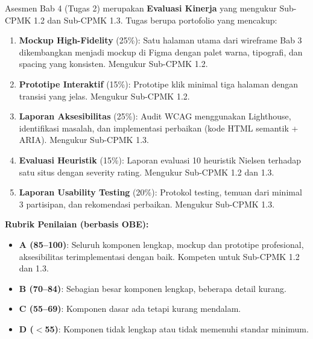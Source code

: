 \documentclass[../main.tex]{subfiles}
\begin{document}
\begin{asesmen}
Asesmen Bab 4 (Tugas 2) merupakan \textbf{Evaluasi Kinerja} yang mengukur Sub-CPMK 1.2 dan Sub-CPMK 1.3. Tugas berupa portofolio yang mencakup:
\begin{enumerate}
  \item \textbf{Mockup High-Fidelity} (25\%): Satu halaman utama dari wireframe Bab 3 dikembangkan menjadi mockup di Figma dengan palet warna, tipografi, dan spacing yang konsisten. Mengukur Sub-CPMK 1.2.
  \item \textbf{Prototipe Interaktif} (15\%): Prototipe klik minimal tiga halaman dengan transisi yang jelas. Mengukur Sub-CPMK 1.2.
  \item \textbf{Laporan Aksesibilitas} (25\%): Audit WCAG menggunakan Lighthouse, identifikasi masalah, dan implementasi perbaikan (kode HTML semantik + ARIA). Mengukur Sub-CPMK 1.3.
  \item \textbf{Evaluasi Heuristik} (15\%): Laporan evaluasi 10 heuristik Nielsen terhadap satu situs dengan severity rating. Mengukur Sub-CPMK 1.2 dan 1.3.
  \item \textbf{Laporan Usability Testing} (20\%): Protokol testing, temuan dari minimal 3 partisipan, dan rekomendasi perbaikan. Mengukur Sub-CPMK 1.3.
\end{enumerate}

\textbf{Rubrik Penilaian (berbasis OBE):}
\begin{itemize}
  \item \textbf{A (85--100)}: Seluruh komponen lengkap, mockup dan prototipe profesional, aksesibilitas terimplementasi dengan baik. Kompeten untuk Sub-CPMK 1.2 dan 1.3.
  \item \textbf{B (70--84)}: Sebagian besar komponen lengkap, beberapa detail kurang.
  \item \textbf{C (55--69)}: Komponen dasar ada tetapi kurang mendalam.
  \item \textbf{D ($<$55)}: Komponen tidak lengkap atau tidak memenuhi standar minimum.
\end{itemize}
\end{asesmen}
\end{document}

